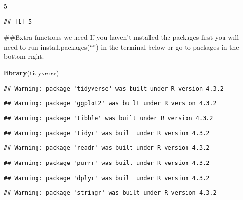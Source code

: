 \documentclass[
]{article}
\newenvironment{Shaded}{\begin{snugshade}}{\end{snugshade}}
\newcommand{\DecValTok}[1]{\textcolor[rgb]{0.00,0.00,0.81}{#1}}
\newcommand{\FunctionTok}[1]{\textcolor[rgb]{0.13,0.29,0.53}{\textbf{#1}}}
\newcommand{\NormalTok}[1]{#1}
\begin{document}
\begin{Shaded}
\begin{Highlighting}[]
\DecValTok{5}
\end{Highlighting}
\end{Shaded}

\begin{verbatim}
## [1] 5
\end{verbatim}

\#\#Extra functions we need If you haven't installed the packages first
you will need to run install.packages(``'') in the terminal below or go
to packages in the bottom right.

\begin{Shaded}
\begin{Highlighting}[]
\FunctionTok{library}\NormalTok{(tidyverse)}
\end{Highlighting}
\end{Shaded}

\begin{verbatim}
## Warning: package 'tidyverse' was built under R version 4.3.2
\end{verbatim}

\begin{verbatim}
## Warning: package 'ggplot2' was built under R version 4.3.2
\end{verbatim}

\begin{verbatim}
## Warning: package 'tibble' was built under R version 4.3.2
\end{verbatim}

\begin{verbatim}
## Warning: package 'tidyr' was built under R version 4.3.2
\end{verbatim}

\begin{verbatim}
## Warning: package 'readr' was built under R version 4.3.2
\end{verbatim}

\begin{verbatim}
## Warning: package 'purrr' was built under R version 4.3.2
\end{verbatim}

\begin{verbatim}
## Warning: package 'dplyr' was built under R version 4.3.2
\end{verbatim}

\begin{verbatim}
## Warning: package 'stringr' was built under R version 4.3.2
\end{verbatim}
\end{document}
